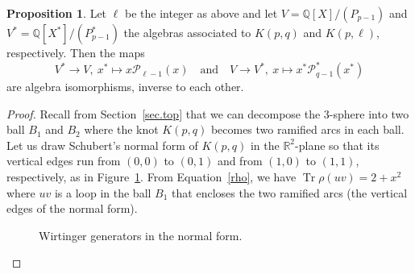 \documentclass{amsart}
\newcommand{\Q}{\mathbb{Q}}
\newcommand{\R}{\mathbb{R}}
\DeclareMathOperator{\Tr}{Tr}
\def\calP{\mathcal{P}}
\theoremstyle{definition}
\newtheorem{Proposition}[Theorem]{Proposition}
\begin{document}
\begin{Proposition}    
\label{thm.dual}
Let $\ell$ be the integer as above and let $V=\Q[X]/(P_{p-1})$ and $V^\ast=\Q[X^\ast]/(P^\ast_{p-1})$ the algebras associated to $K(p,q)$ and $K(p,\ell)$, respectively. Then the maps  
$$V^\ast\to V, \ x^\ast\mapsto x \calP_{\ell-1}(x) \quad \text{and} \quad V\to V^\ast, \  x\mapsto x^\ast \calP^\ast_{q-1}(x^\ast)$$
are algebra isomorphisms, inverse to each other.
\end{Proposition}
\begin{proof}
    Recall from Section~\ref{sec.top} that we can decompose the 3-sphere into two ball $B_1$ and $B_2$ where the knot $K(p,q)$ becomes two ramified arcs in each ball. Let us draw Schubert's normal form of $K(p,q)$ in the $\R^2$-plane so that its vertical edges run from $(0,0)$ to $(0,1)$ and from $(1,0)$ to $(1,1)$, respectively, as in Figure~\ref{fig.schubert_proof}. From Equation~\eqref{rho}, we have $\Tr\rho(uv)=2+x^2$ where $uv$ is a loop in the ball $B_1$ that encloses the two ramified arcs (the vertical edges of the normal form). 
    \begin{figure}[htpb!]
        \centering
        
        \caption{Wirtinger generators in the normal form.}
        \label{fig.schubert_proof}
    \end{figure}


\end{proof}
\end{document}
